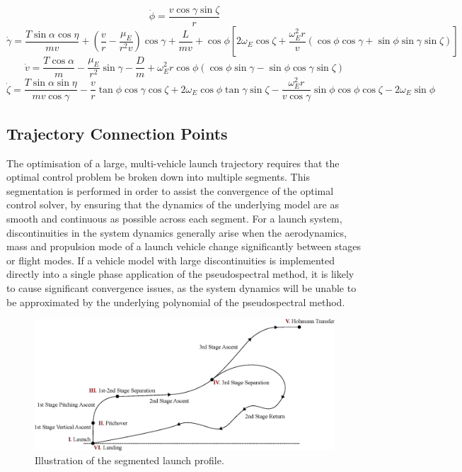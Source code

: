 \begin{equation}
\dot{\phi} = \frac{v\cos\gamma\sin\zeta}{r}
\end{equation}
\begin{equation}
\dot{\gamma} = \frac{T\sin\alpha \cos\eta}{mv} + (\frac{v}{r}-\frac{\mu_E}{r^2 v})\cos\gamma + \frac{L}{mv}
+ \cos\phi[2\omega_E \cos\zeta + \frac{\omega_E^2 r}{v}(\cos\phi\cos\gamma+\sin\phi\sin\gamma\sin\zeta)]
\end{equation}
\begin{equation}
\dot{v} = \frac{T\cos\alpha}{m}-\frac{\mu_E}{r^2}\sin\gamma - \frac{D}{m}
+ \omega_E^2 r\cos\phi(\cos\phi\sin\gamma-\sin\phi\cos\gamma\sin\zeta)
\end{equation}
\begin{equation}
\dot{\zeta} = \frac{T\sin\alpha \sin\eta}{mv \cos \gamma}-\frac{v}{r}\tan\phi\cos\gamma\cos\zeta +2\omega_E\cos\phi\tan\gamma\sin\zeta - \frac{\omega_E^2 r}{v\cos\gamma}\sin\phi\cos\phi\cos\zeta-2\omega_E\sin\phi 
\end{equation}

\subsection{Trajectory Connection Points}
The optimisation of a large, multi-vehicle launch trajectory requires that the optimal control problem be broken down into multiple segments. This segmentation is performed in order to assist the convergence of the optimal control solver, by ensuring that the dynamics of the underlying model are as smooth and continuous as possible across each segment. 
For a launch system, discontinuities in the system dynamics generally arise when the aerodynamics, mass and propulsion mode of a launch vehicle change significantly between stages or flight modes. 
If a vehicle model with large discontinuities is implemented directly into a single phase application of the pseudospectral method, it is likely to cause significant convergence issues, as the system dynamics will be unable to be approximated by the underlying polynomial of the pseudospectral method. 
 \begin{figure}[ht]
 	\centering
 	\includegraphics[width=1.\linewidth]{figures/4_LODESTAR/Traj}
 	\caption{Illustration of the segmented launch profile.}
 	\label{fig:Traj}
 \end{figure}
 

